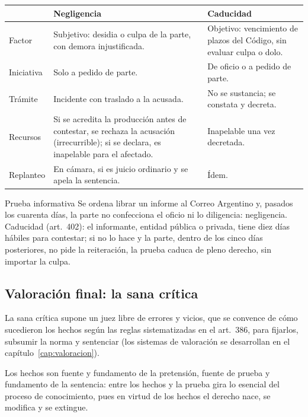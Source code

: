 \documentclass[12pt,oneside]{book}
\renewcommand{\arraystretch}{1.15}
\begin{document}
\begin{table}[H]
\centering
\renewcommand{\arraystretch}{1.25}
\begin{tabularx}{\textwidth}{>{\RaggedRight\arraybackslash}p{}>{\RaggedRight\arraybackslash}X>{\RaggedRight\arraybackslash}X}
\toprule
 & \textbf{Negligencia} & \textbf{Caducidad} \\
\midrule
Factor & Subjetivo: desidia o culpa de la parte, con demora injustificada. & Objetivo: vencimiento de plazos del Código, sin evaluar culpa o dolo. \\
Iniciativa & Solo a pedido de parte. & De oficio o a pedido de parte. \\
Trámite & Incidente con traslado a la acusada. & No se sustancia; se constata y decreta. \\
Recursos & Si se acredita la producción antes de contestar, se rechaza la acusación (irrecurrible); si se declara, es inapelable para el afectado. & Inapelable una vez decretada. \\
Replanteo & En cámara, si es juicio ordinario y se apela la sentencia. & Ídem. \\
\bottomrule
\end{tabularx}
\end{table}

\begin{example}{Prueba informativa}
Se ordena librar un informe al Correo Argentino y, pasados los cuarenta días, la parte no confecciona el oficio ni lo diligencia: negligencia. Caducidad (art.~402): el informante, entidad pública o privada, tiene diez días hábiles para contestar; si no lo hace y la parte, dentro de los cinco días posteriores, no pide la reiteración, la prueba caduca de pleno derecho, sin importar la culpa.
\end{example}

\subsection{Valoración final: la sana crítica}

La sana crítica supone un juez libre de errores y vicios, que se convence de cómo sucedieron los hechos según las reglas sistematizadas en el art.~386, para fijarlos, subsumir la norma y sentenciar (los sistemas de valoración se desarrollan en el capítulo~\ref{cap:valoracion}). %

\begin{important}
Los hechos son fuente y fundamento de la pretensión, fuente de prueba y fundamento de la sentencia: entre los hechos y la prueba gira lo esencial del proceso de conocimiento, pues en virtud de los hechos el derecho nace, se modifica y se extingue.
\end{important}
\end{document}
